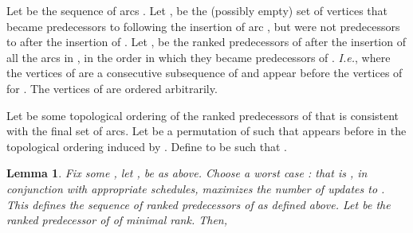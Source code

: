 \documentclass[11pt]{article}
\theoremstyle{plain}
\newtheorem{lem}[thm]{Lemma}
\theoremstyle{definition}
\theoremstyle{remark}
\numberwithin{equation}{section}
\begin{document}
 Let  be the sequence of arcs . Let ,  be the (possibly empty) set of vertices that became predecessors to  following
the insertion of arc , but were not predecessors to  after the insertion of .
Let
,  be the ranked predecessors of  after the insertion of all the arcs in , in the order in which they became predecessors of . {\sl I.e.}, where the vertices of  are a consecutive subsequence of  and appear before the vertices of  for . The vertices of  are ordered arbitrarily.

Let  be some topological ordering of the ranked predecessors of  that is consistent with the final set of arcs.
Let  be a
permutation of  such that  appears before
 in the topological ordering induced by . Define  to be such that .

\begin{lem}
\label{lem:mapping} Fix some ,
  let ,  be as above. Choose a worst case : that is , in conjunction with appropriate schedules, maximizes the number of updates to .
  This defines the sequence   of ranked predecessors of  as defined above.
  Let  be the ranked predecessor of  of minimal rank. Then, 
\end{lem}
\end{document}
